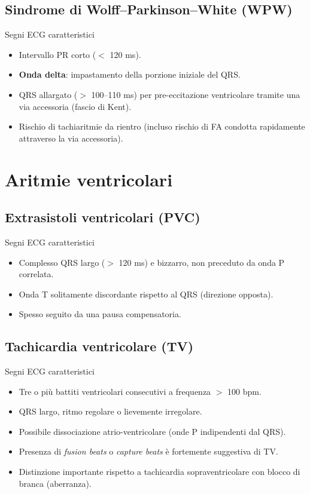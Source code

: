 \documentclass[11pt,a4paper]{article}
\begin{document}
\subsection{Sindrome di Wolff--Parkinson--White (WPW)}
\begin{keybox}{Segni ECG caratteristici}
\begin{itemize}[leftmargin=1.2em]
  \item Intervallo PR corto ($<$ 120 ms).
  \item \textbf{Onda delta}: impastamento della porzione iniziale del QRS.
  \item QRS allargato ($>$ 100--110 ms) per pre-eccitazione ventricolare tramite una via accessoria (fascio di Kent).
  \item Rischio di tachiaritmie da rientro (incluso rischio di FA condotta rapidamente attraverso la via accessoria).
\end{itemize}
\end{keybox}

\section{Aritmie ventricolari}

\subsection{Extrasistoli ventricolari (PVC)}
\begin{keybox}{Segni ECG caratteristici}
\begin{itemize}[leftmargin=1.2em]
  \item Complesso QRS largo ($>$ 120 ms) e bizzarro, non preceduto da onda P correlata.
  \item Onda T solitamente discordante rispetto al QRS (direzione opposta).
  \item Spesso seguito da una pausa compensatoria.
\end{itemize}
\end{keybox}

\subsection{Tachicardia ventricolare (TV)}
\begin{keybox}{Segni ECG caratteristici}
\begin{itemize}[leftmargin=1.2em]
  \item Tre o più battiti ventricolari consecutivi a frequenza $>$ 100 bpm.
  \item QRS largo, ritmo regolare o lievemente irregolare.
  \item Possibile dissociazione atrio-ventricolare (onde P indipendenti dal QRS).
  \item Presenza di \textit{fusion beats} o \textit{capture beats} è fortemente suggestiva di TV.
  \item Distinzione importante rispetto a tachicardia sopraventricolare con blocco di branca (aberranza).
\end{itemize}
\end{keybox}
\end{document}
